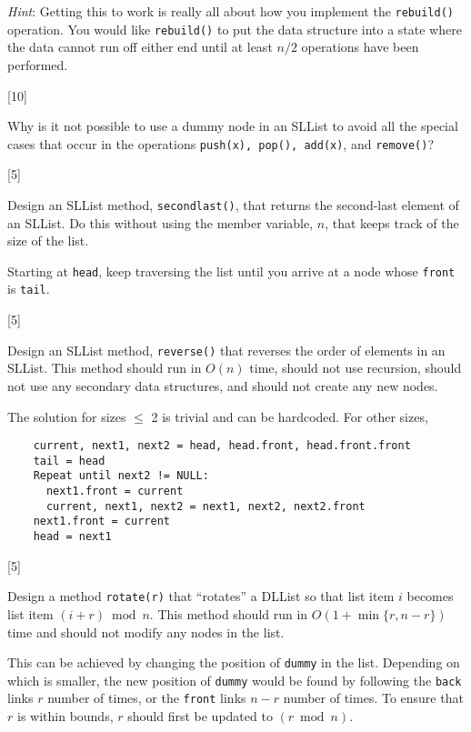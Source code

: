 \documentclass[addpoints]{exam}
\begin{document}
\begin{questions}
{\it Hint}: Getting this to work is really all about how you implement the {\tt rebuild()} operation. You would like {\tt rebuild()} to put the data structure into a state where the data cannot run off either end until at least $n/2$ operations have been performed.
\begin{solution}
\end{solution}

[10]

Why is it not possible to use a dummy node in an SLList to avoid all the special cases that occur in the operations {\tt push(x), pop(), add(x)}, and {\tt remove()}?
\begin{solution}
\end{solution}

[5]

Design an SLList method, {\tt second\textunderscore last()}, that returns the second-last element of an SLList. Do this without using the member variable, $n$, that keeps track of the size of the list.
\begin{solution}
  Starting at {\tt head}, keep traversing the list until you arrive at a node whose {\tt front} is {\tt tail}.
\end{solution}

[5]

Design an SLList method, {\tt reverse()} that reverses the order of elements in an SLList. This method should run in $O(n)$ time, should not use recursion, should not use any secondary data structures, and should not create any new nodes.
\begin{solution}
  The solution for sizes $\leq$ 2 is trivial and can be hardcoded. For other sizes,
  \begin{verbatim}
    current, next1, next2 = head, head.front, head.front.front
    tail = head
    Repeat until next2 != NULL:
      next1.front = current
      current, next1, next2 = next1, next2, next2.front
    next1.front = current
    head = next1
\end{verbatim}
\end{solution}

[5]

Design a method {\tt rotate(r)} that ``rotates'' a DLList so that list item $i$ becomes list item $(i + r) \bmod n$. This method should run in $O(1 + \min\{r, n-r\})$ time and should not modify any nodes in the list.
\begin{solution}
  This can be achieved by changing the position of {\tt dummy} in the list. Depending on which is smaller, the new position of {\tt dummy} would be found by following the {\tt back} links $r$ number of times, or the {\tt front} links $n-r$ number of times. To ensure that $r$ is within bounds, $r$ should first be updated to $(r\bmod n)$.
\end{solution}


\end{questions}
\end{document}
